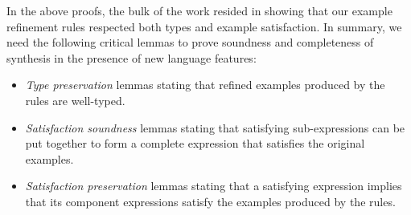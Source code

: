 In the above proofs, the bulk of the work resided in showing that our example refinement rules respected both types and example satisfaction.
In summary, we need the following critical lemmas to prove soundness and completeness of synthesis in the presence of new language features:
\begin{itemize}
  \item \emph{Type preservation} lemmas stating that refined examples produced by the  rules are well-typed.
  \item \emph{Satisfaction soundness} lemmas stating that satisfying sub-expressions can be put together to form a complete expression that satisfies the original examples.
  \item \emph{Satisfaction preservation} lemmas stating that a satisfying expression implies that its component expressions satisfy the examples produced by the  rules.
\end{itemize}
